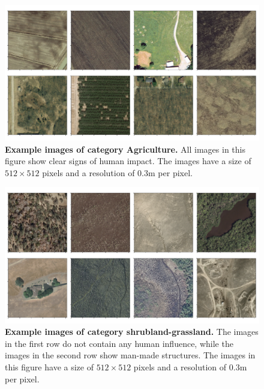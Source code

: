 \begin{figure}[H]
	\centering
	\captionsetup{width=1\linewidth}
	\includegraphics[width=1\textwidth]{Figures/agriculture_sample.pdf}
	\caption{\textbf{Example images of category Agriculture.} All images in this figure show clear signs of human impact. The images have a size of $512\times512$ pixels and a resolution of $0.3$m per pixel.}
	\label{fig:agriculture_sample}
\end{figure}

\begin{figure}[H]
	\centering
	\captionsetup{width=1\linewidth}
	\includegraphics[width=1\textwidth]{Figures/shrubland-grassland_sample.pdf}
	\caption{\textbf{Example images of category shrubland-grassland.} The images in the first row do not contain any human influence, while the images in the second row show man-made structures. The images in this figure have a size of $512\times512$ pixels and a resolution of $0.3$m per pixel.}
	\label{fig:shrubland-sample}
\end{figure}

